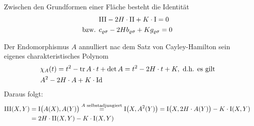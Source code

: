 \begin{satz}\label{satz232}
 Zwischen den Grundformen einer Fläche besteht die Identität
 \begin{align*}
  &\Rom3 - 2 H \cdot \Rom2 + K \cdot \Rom1 = 0 \\
  \text{bzw. } & c_{\varrho \sigma} - 2 H b_{\varrho \sigma} + K g_{\varrho \sigma} = 0
 \end{align*}

\end{satz}

\begin{beweis}
 Der Endomorphismus \(A\) annulliert nac dem Satz von Cayley-Hamilton sein eigenes charakteristisches Polynom 
 \begin{align*}
  &\chi_A(t) = t^2 - \operatorname{tr} A \cdot t + \det A = t^2 - 2H \cdot t + K, \text{ d.h. es gilt} \\
  &A^2 - 2H \cdot A + K \cdot \operatorname{Id}
 \end{align*}
 Daraus folgt:
 \begin{align*}
  \Rom3(X,Y) &= \Rom1 \big(A(X),A(Y)\big) \stackrel{A \text{ selbstadjungiert}}{=} \Rom1\big(X, A^2(Y)\big) = \Rom1 \big(X,2H \cdot A(Y)\big) - K \cdot \Rom1(X,Y) \\
  &=2H \cdot \Rom2(X,Y) - K \cdot \Rom1(X,Y)
 \end{align*}

\end{beweis}
